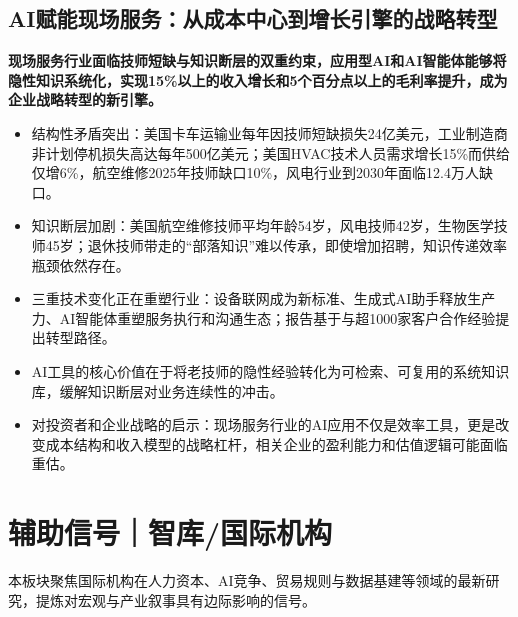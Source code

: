 \documentclass[11pt]{ctexart}
\begin{document}
\subsection{AI赋能现场服务：从成本中心到增长引擎的战略转型}
\textbf{现场服务行业面临技师短缺与知识断层的双重约束，应用型AI和AI智能体能够将隐性知识系统化，实现15\%以上的收入增长和5个百分点以上的毛利率提升，成为企业战略转型的新引擎。}
\begin{itemize}
  \item 结构性矛盾突出：美国卡车运输业每年因技师短缺损失24亿美元，工业制造商非计划停机损失高达每年500亿美元；美国HVAC技术人员需求增长15\%而供给仅增6\%，航空维修2025年技师缺口10\%，风电行业到2030年面临12.4万人缺口。
  \item 知识断层加剧：美国航空维修技师平均年龄54岁，风电技师42岁，生物医学技师45岁；退休技师带走的“部落知识”难以传承，即使增加招聘，知识传递效率瓶颈依然存在。
  \item 三重技术变化正在重塑行业：设备联网成为新标准、生成式AI助手释放生产力、AI智能体重塑服务执行和沟通生态；报告基于与超1000家客户合作经验提出转型路径。
  \item AI工具的核心价值在于将老技师的隐性经验转化为可检索、可复用的系统知识库，缓解知识断层对业务连续性的冲击。
  \item 对投资者和企业战略的启示：现场服务行业的AI应用不仅是效率工具，更是改变成本结构和收入模型的战略杠杆，相关企业的盈利能力和估值逻辑可能面临重估。
\end{itemize}
\newpage
\section{辅助信号｜智库/国际机构}
本板块聚焦国际机构在人力资本、AI竞争、贸易规则与数据基建等领域的最新研究，提炼对宏观与产业叙事具有边际影响的信号。
\end{document}
